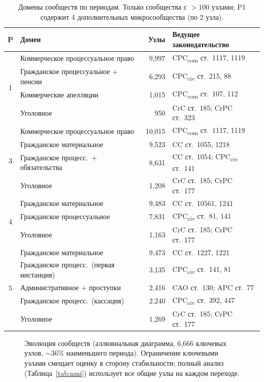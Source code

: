 \documentclass[11pt]{article}
\begin{document}
\begin{table}[t]
\centering
\small
\caption{Домены сообществ по периодам. Только сообщества с $> 100$ узлами; P1 содержит 4 дополнительных микросообщества (по 2 узла).}
\label{tab:domains}
\begin{tabular}{@{}clrl@{}}
\toprule
\textbf{P} & \textbf{Домен} & \textbf{Узлы} & \textbf{Ведущее законодательство} \\
\midrule
\multirow{4}{*}{1} & Коммерческое процессуальное право & 9{,}997 & CPC\textsubscript{com} ст.~1117, 1119 \\
 & Гражданское процессуальное + пенсии & 6{,}293 & CPC\textsubscript{civ} ст.~215, 88 \\
 & Коммерческие апелляции & 1{,}015 & CPC\textsubscript{com} ст.~107, 112 \\
 & Уголовное & 950 & CrC ст.~185; CrPC ст.~323 \\
\midrule
\multirow{4}{*}{3} & Коммерческое процессуальное право & 10{,}015 & CPC\textsubscript{com} ст.~1117, 1119 \\
 & Гражданское материальное & 9{,}523 & CC ст.~1055, 1218 \\
 & Гражданское процесс.\ + обязательства & 8{,}631 & CC ст.~1054; CPC\textsubscript{civ} ст.~141 \\
 & Уголовное & 1{,}208 & CrC ст.~185; CrPC ст.~177 \\
\midrule
\multirow{3}{*}{4} & Гражданское материальное & 9{,}483 & CC ст.~10561, 1241 \\
 & Гражданское процессуальное & 7{,}831 & CPC\textsubscript{civ} ст.~81, 141 \\
 & Уголовное & 1{,}163 & CrC ст.~185; CrPC ст.~177 \\
\midrule
\multirow{5}{*}{5} & Гражданское материальное & 9{,}473 & CC ст.~1227, 1221 \\
 & Гражданское процесс.\ (первая инстанция) & 3{,}135 & CPC\textsubscript{civ} ст.~141, 81 \\
 & Административное + проступки & 2{,}416 & CAO ст.~130; APC ст.~77 \\
 & Гражданское процесс.\ (кассация) & 2{,}240 & CPC\textsubscript{civ} ст.~392, 447 \\
 & Уголовное & 1{,}269 & CrC ст.~185; CrPC ст.~177 \\
\bottomrule
\end{tabular}
\end{table}

\begin{figure}[t]
\centering

\caption{Эволюция сообществ (аллювиальная диаграмма, 6{,}666 ключевых узлов, ${\sim}36\%$ наименьшего периода). Ограничение ключевыми узлами смещает оценку в сторону стабильности; полный анализ (Таблица~\ref{tab:nmi}) использует все общие узлы на каждом переходе.}
\label{fig:alluvial}
\end{figure}
\end{document}
